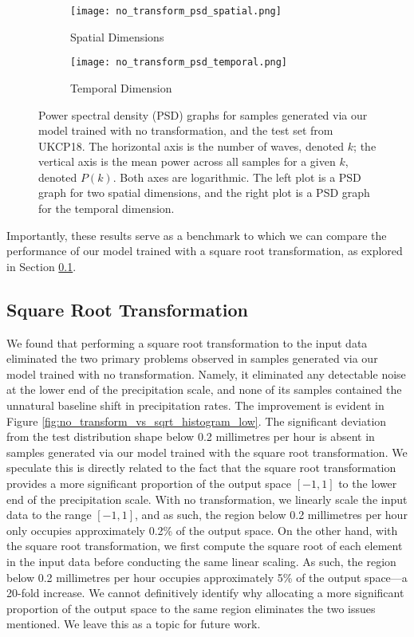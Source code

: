 \documentclass[ oneside,%
                    author={George Herbert},
                    degree={MSci},
                     title={Video Diffusion Models for Climate Simulations},
                  subtitle={}]{dissertation}
\begin{document}
\begin{figure}[htbp]
      \centering
      \begin{subfigure}{0.49\textwidth}
            \texttt{[image: no\_transform\_psd\_spatial.png]}
            \caption{Spatial Dimensions}
      \end{subfigure}
      \begin{subfigure}{0.49\textwidth}
            \texttt{[image: no\_transform\_psd\_temporal.png]}
            \caption{Temporal Dimension}
      \end{subfigure}
      \caption{Power spectral density (PSD) graphs for samples generated via our model trained with no transformation, and the test set from UKCP18. The horizontal axis is the number of waves, denoted $k$; the vertical axis is the mean power across all samples for a given $k$, denoted $P(k)$. Both axes are logarithmic. The left plot is a PSD graph for two spatial dimensions, and the right plot is a PSD graph for the temporal dimension.}
      \label{fig:no_transform_psd}
\end{figure}

Importantly, these results serve as a benchmark to which we can compare the performance of our model trained with a square root transformation, as explored in Section \ref{sec:results_square_root}.

\subsection{Square Root Transformation}
\label{sec:results_square_root}

We found that performing a square root transformation to the input data eliminated the two primary problems observed in samples generated via our model trained with no transformation. Namely, it eliminated any detectable noise at the lower end of the precipitation scale, and none of its samples contained the unnatural baseline shift in precipitation rates. The improvement is evident in Figure \ref{fig:no_transform_vs_sqrt_histogram_low}. The significant deviation from the test distribution shape below 0.2 millimetres per hour is absent in samples generated via our model trained with the square root transformation. We speculate this is directly related to the fact that the square root transformation provides a more significant proportion of the output space $[-1, 1]$ to the lower end of the precipitation scale. With no transformation, we linearly scale the input data to the range $[-1, 1]$, and as such, the region below 0.2 millimetres per hour only occupies approximately 0.2\% of the output space. On the other hand, with the square root transformation, we first compute the square root of each element in the input data before conducting the same linear scaling. As such, the region below 0.2 millimetres per hour occupies approximately 5\% of the output space---a 20-fold increase. We cannot definitively identify why allocating a more significant proportion of the output space to the same region eliminates the two issues mentioned. We leave this as a topic for future work.
\end{document}
